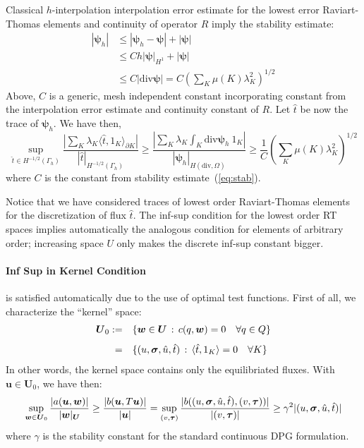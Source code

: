 \documentclass[letterpaper]{article}
\def\bftau{\boldsymbol\tau}
\newcommand{\ptl}{{\partial}}
\newcommand{\bfsig}{\mbox{\boldmath $\sigma$}}
\newcommand{\bfu}{\boldsymbol u}
\newcommand{\bfU}{\boldsymbol U}
\newcommand{\bfw}{\boldsymbol w}
\newcommand{\bfpsi}{\boldsymbol\psi}
\begin{document}
Classical $h$-interpolation interpolation error estimate for the lowest error
Raviart-Thomas elements and continuity of operator $R$ imply the stability estimate:
\begin{equation}
\begin{array}{lll}
| \bfpsi_h | & \leq | \bfpsi_h - \bfpsi | + | \bfpsi |\\[8pt]
&\leq C h | \bfpsi |_{H^1} +  | \bfpsi | \\[8pt]
& \leq C | \text{div} \bfpsi | = C (\sum_K \mu(K) \lambda_K^2)^{1/2}
\end{array}
\label{eq:stab}
\end{equation}
Above, $C$ is a generic, mesh independent constant incorporating constant from
the interpolation error estimate and continuity constant of $R$.
Let $\hat{t}$ be now the trace of $\bfpsi_h$. We have then,
\begin{equation}
\sup_{\hat{t} \in H^{-1/2}(\Gamma_h)} \frac{|  \sum_K \lambda_K \langle \hat{t},1_K \rangle_{\ptl K} |}{| \hat{t} |_{H^{-1/2}(\Gamma_h)}}
\geq \frac{| \sum_K \lambda_K \int_K \text{div} \bfpsi_h \: 1_K  |}
{| \bfpsi_h |_{H(\text{div},\Omega)}}
\geq \frac{1}{C} (\sum_K \mu(K) \lambda_K^2)^{1/2}
\end{equation}
where $C$ is the constant from stability estimate~(\ref{eq:stab}).

Notice that we have considered traces of lowest order Raviart-Thomas elements for the
discretization of flux $\hat{t}$. The inf-sup condition for the lowest order RT spaces implies
automatically the analogous condition for elements of arbitrary order; increasing
space $U$ only makes the discrete inf-sup constant bigger.




\paragraph{Inf Sup in Kernel Condition} is satisfied automatically due to the use of optimal
test functions. First of all, we characterize the ``kernel'' space:
\begin{equation}
\begin{array}{rl}
\bfU_0  := & \{ \bfw \in \bfU \, : \, c(q,\bfw) = 0 \quad \forall q \in Q\} \\[8pt]
 = &\{ (u,\bfsig,\hat{u},\hat{t}) \, : \, \langle \hat{t},1_K \rangle = 0
 \quad \forall K \}
\end{array}
\end{equation}
In other words, the kernel space contains only the equilibriated fluxes.
With $\bfu \in \bfU_0$, we have then:
\begin{equation}
   \sup_{\bfw \in \bfU_0} \frac{| a(\bfu,\bfw) |}{| \bfw |_{\bfU} }
 \geq \frac{| b(\bfu,T \bfu) |}{| \bfu |}
= \sup_{(v,\bftau)}
\frac{| b((u,\bfsig,\hat{u},\hat{t}), (v,\bftau)) |}{| (v,\bftau) |}
\geq \gamma^2 | (u,\bfsig,\hat{u},\hat{t}) |
\end{equation}
where $\gamma$ is the stability constant for the standard continuous DPG formulation.
\end{document}
